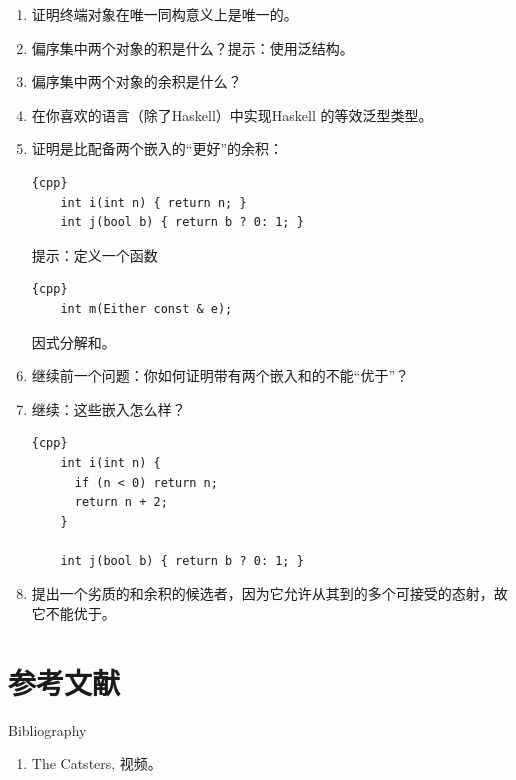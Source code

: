 \begin{enumerate}
  \tightlist
  \item
  证明终端对象在唯一同构意义上是唯一的。
  \item
  偏序集中两个对象的积是什么？提示：使用泛结构。
  \item
  偏序集中两个对象的余积是什么？
  \item
  在你喜欢的语言（除了Haskell）中实现Haskell 的等效泛型类型。
  \item
  证明是比配备两个嵌入的“更好”的余积：

  \begin{lstlisting}{cpp}
    int i(int n) { return n; }
    int j(bool b) { return b ? 0: 1; }
  \end{lstlisting}

  提示：定义一个函数

  \begin{lstlisting}{cpp}
    int m(Either const & e);
  \end{lstlisting}

  因式分解和。
  \item
  继续前一个问题：你如何证明带有两个嵌入和的不能“优于”？
  \item
  继续：这些嵌入怎么样？

  \begin{lstlisting}{cpp}
    int i(int n) {
      if (n < 0) return n;
      return n + 2;
    }

    int j(bool b) { return b ? 0: 1; }
  \end{lstlisting}
  \item
  提出一个劣质的和余积的候选者，因为它允许从其到的多个可接受的态射，故它不能优于。
\end{enumerate}

\section{参考文献}{Bibliography}

\begin{enumerate}
  \tightlist
  \item
  The Catsters,
   视频。
\end{enumerate}
